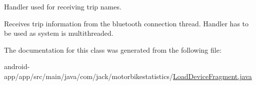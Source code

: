 Handler used for receiving trip names. 

Receives trip information from the bluetooth connection thread. Handler has to be used as system is multithreaded. 

The documentation for this class was generated from the following file\+:\begin{DoxyCompactItemize}
\item 
android-\/app/app/src/main/java/com/jack/motorbikestatistics/\hyperlink{_load_device_fragment_8java}{Load\+Device\+Fragment.\+java}\end{DoxyCompactItemize}
